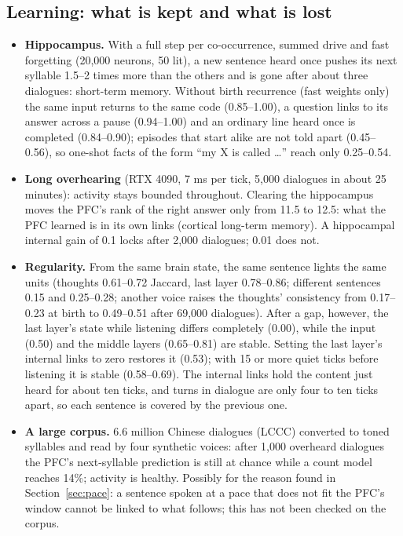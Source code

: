 \documentclass[11pt]{article}
\begin{document}
\subsection{Learning: what is kept and what is lost}
\begin{itemize}
\item \textbf{Hippocampus.} With a full step per co-occurrence, summed drive and fast forgetting (20,000 neurons, 50 lit),
a new sentence heard once pushes its next syllable 1.5--2 times more than the others and is gone after about three
dialogues: short-term memory. Without birth recurrence (fast weights only) the same input returns to the same code
(0.85--1.00), a question links to its answer across a pause (0.94--1.00) and an ordinary line heard once is completed
(0.84--0.90); episodes that start alike are not told apart (0.45--0.56), so one-shot facts of the form ``my X is called
\dots'' reach only 0.25--0.54.
\item \textbf{Long overhearing} (RTX 4090, 7 ms per tick, 5,000 dialogues in about 25 minutes): activity stays bounded
throughout. Clearing the hippocampus moves the PFC's rank of the right answer only from 11.5 to 12.5: what the PFC learned
is in its own links (cortical long-term memory). A hippocampal internal gain of 0.1 locks after 2,000 dialogues; 0.01 does
not.
\item \textbf{Regularity.} From the same brain state, the same sentence lights the same units (thoughts 0.61--0.72 Jaccard,
last layer 0.78--0.86; different sentences 0.15 and 0.25--0.28; another voice raises the thoughts' consistency from
0.17--0.23 at birth to 0.49--0.51 after 69,000 dialogues). After a gap, however, the last layer's state while listening
differs completely (0.00), while the input (0.50) and the middle layers (0.65--0.81) are stable. Setting the last layer's
internal links to zero restores it (0.53); with 15 or more quiet ticks before listening it is stable (0.58--0.69). The
internal links hold the content just heard for about ten ticks, and turns in dialogue are only four to ten ticks apart, so
each sentence is covered by the previous one.
\item \textbf{A large corpus.} 6.6 million Chinese dialogues (LCCC) converted to toned syllables and read by four
synthetic voices: after 1,000 overheard dialogues the PFC's next-syllable prediction is still at chance while a count model
reaches 14\%; activity is healthy. Possibly for the reason found in Section~\ref{sec:pace}: a sentence spoken at a pace that does not fit the PFC's
window cannot be linked to what follows; this has not been checked on the corpus.
\end{itemize}
\end{document}

